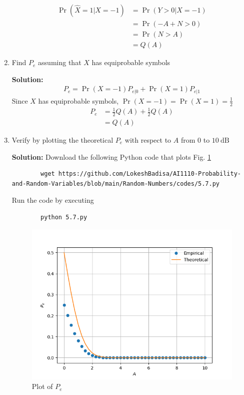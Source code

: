 \documentclass[journal,12pt,twocolumn]{IEEEtran}
\newcommand{\solution}{\noindent \textbf{Solution: }}
\providecommand{\pr}[1]{\ensuremath{\Pr\left(#1\right)}}
\numberwithin{equation}{section}
\renewcommand\thesection{\arabic{section}}
\begin{document}
\begin{enumerate}[label=\thesection.\arabic*,ref=\thesection.\theenumi]
	\begin{align}
		\pr{\hat{X}=1|X=-1} &= \pr{Y>0|X=-1} \\
		&= \pr{-A+N>0} \\
		&= \pr{N>A} \\
		&= Q(A)		
	\end{align}
	
	\item Find $P_e$ assuming that $X$ has equiprobable symbols
	
	\solution 
	\begin{align}
		P_e = \pr{X=-1} P_{e|0} + \pr{X=1} P_{e|1}
	\end{align}
	Since $X$ has equiprobable symbols, $\pr{X=-1} = \pr{X=1} = \frac12$
	\begin{align}
		P_e &= \frac12 Q(A) + \frac12 Q(A) \\
		&= Q(A)	
	\end{align}		
	
	\item Verify by plotting the theoretical $P_e$ with respect to $A$ from $0$ to $10 ~\mathrm{dB}$
	
	\solution Download the following Python code that plots Fig. \ref{fig-5.7}
	\begin{lstlisting}
		wget https://github.com/LokeshBadisa/AI1110-Probability-and-Random-Variables/blob/main/Random-Numbers/codes/5.7.py
	\end{lstlisting}
	Run the code by executing
	\begin{lstlisting}
		python 5.7.py
	\end{lstlisting}
	\begin{figure}
		\centering
		\includegraphics[width=\columnwidth]{./figs/5.7.png}
		\caption{Plot of $P_e$}
		\label{fig-5.7}
	\end{figure}
	

\end{enumerate}
\end{document}
